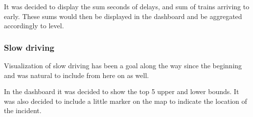 It was decided to display the sum seconds of delays, and sum of trains
arriving to early. These sums would then be displayed in the dashboard and be
aggregated accordingly to level.


\subsubsection{Slow driving} %
\label{ssub:slow_driving}
Visualization of slow driving has been a goal along the way since the beginning
and was natural to include from here on as well.

In the dashboard it was decided to show the top 5 upper and lower bounds.
It was also decided to include a little marker on the map to indicate the
location of the incident.



